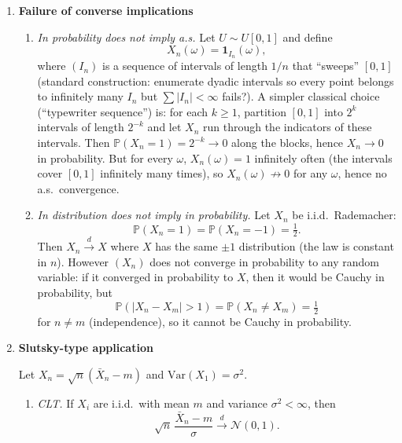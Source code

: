 \documentclass[11pt]{article}
\begin{document}
\begin{enumerate}
\begin{enumerate}
\item If $(X,Y)$ is jointly Gaussian, then $\mathbb{E}[X\mid Y]$ is affine in $Y$, and the
best affine predictor coincides with the conditional expectation:
\[
\mathbb{E}[X\mid Y]=aY+b,
\quad
a=\frac{\mathrm{Cov}(X,Y)}{\mathrm{Var}(Y)},\ \ b=\mathbb{E}[X]-a\mathbb{E}[Y].
\]
\end{enumerate}

\bigskip

\item \textbf{Failure of converse implications}

\begin{enumerate}
\item \emph{In probability does not imply a.s.}
Let $U\sim U[0,1]$ and define
\[
X_n(\omega)=\mathbf{1}_{I_n}(\omega),
\]
where $(I_n)$ is a sequence of intervals of length $1/n$ that ``sweeps'' $[0,1]$ (standard construction:
enumerate dyadic intervals so every point belongs to infinitely many $I_n$ but $\sum |I_n|<\infty$ fails?).
A simpler classical choice (``typewriter sequence'') is:
for each $k\ge1$, partition $[0,1]$ into $2^k$ intervals of length $2^{-k}$ and let $X_n$ run through
the indicators of these intervals.
Then $\mathbb{P}(X_n=1)=2^{-k}\to 0$ along the blocks, hence $X_n\to 0$ in probability.
But for every $\omega$, $X_n(\omega)=1$ infinitely often (the intervals cover $[0,1]$ infinitely many times),
so $X_n(\omega)\not\to 0$ for any $\omega$, hence no a.s.\ convergence.

\item \emph{In distribution does not imply in probability.}
Let $X_n$ be i.i.d.\ Rademacher:
\[
\mathbb{P}(X_n=1)=\mathbb{P}(X_n=-1)=\tfrac12.
\]
Then $X_n \xrightarrow{d} X$ where $X$ has the same $\pm1$ distribution (the law is constant in $n$).
However $(X_n)$ does not converge in probability to any random variable:
if it converged in probability to $X$, then it would be Cauchy in probability, but
\[
\mathbb{P}(|X_n-X_m|>1)=\mathbb{P}(X_n\neq X_m)=\tfrac12
\]
for $n\neq m$ (independence), so it cannot be Cauchy in probability.
\end{enumerate}

\bigskip

\item \textbf{Slutsky-type application}

Let $X_n=\sqrt{n}(\bar X_n-m)$ and $\mathrm{Var}(X_1)=\sigma^2$.

\begin{enumerate}
\item \emph{CLT.}
If $X_i$ are i.i.d.\ with mean $m$ and variance $\sigma^2<\infty$, then
\[
\sqrt{n}\,\frac{\bar X_n-m}{\sigma}\xrightarrow{d}\mathcal{N}(0,1).
\]


\end{enumerate}
\end{enumerate}
\end{document}
